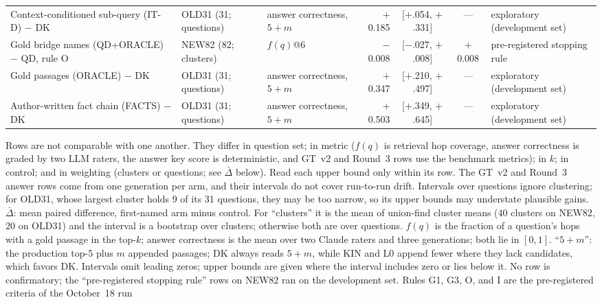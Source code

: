 \begin{table}[p]
\begin{threeparttable}
\begin{tabular}{@{}>{\raggedright\arraybackslash}p{4.7cm}>{\raggedright\arraybackslash}p{2.6cm}>{\raggedright\arraybackslash}p{2.5cm}rcc>{\raggedright\arraybackslash}p{2.2cm}@{}}
Context-conditioned sub-query (IT-D) $-$ DK & OLD31 (31; questions) & answer correctness, $5{+}m$ & $+$0.185 & {\scriptsize [$+$.054, $+$.331]} & ---\tnote{d} & exploratory (development set) \\
Gold bridge names (QD+ORACLE) $-$ QD, rule O & NEW82 (82; clusters) & $f(q)$@6 & $-$0.008 & {\scriptsize [$-$.027, $+$.008]} & $+$0.008 & pre-registered stopping rule \\
Gold passages (ORACLE) $-$ DK & OLD31 (31; questions) & answer correctness, $5{+}m$ & $+$0.347 & {\scriptsize [$+$.210, $+$.497]} & --- & exploratory (development set) \\
Author-written fact chain (FACTS) $-$ DK & OLD31 (31; questions) & answer correctness, $5{+}m$ & $+$0.503 & {\scriptsize [$+$.349, $+$.645]} & --- & exploratory (development set) \\
\bottomrule
\end{tabular}
\begin{tablenotes}\footnotesize
\item Rows are not comparable with one another. They differ in question
set; in metric ($f(q)$ is retrieval hop coverage, answer correctness is
graded by two LLM raters, the answer key score is deterministic, and
GT~v2 and Round~3 rows use the benchmark metrics); in $k$; in control;
and in weighting (clusters or questions; see $\bar{\Delta}$ below). Read each upper bound only within its
row. The GT~v2 and Round~3 answer rows come from one generation per arm,
and their intervals do not cover run-to-run drift. Intervals over
questions ignore clustering; for OLD31, whose largest cluster holds 9 of
its 31 questions, they may be too narrow, so its upper bounds may
understate plausible gains. $\bar{\Delta}$: mean paired difference, first-named arm minus
control. For ``clusters'' it is the mean of union-find cluster means (40
clusters on NEW82, 20 on OLD31) and the interval is a bootstrap over
clusters; otherwise both are over questions. $f(q)$ is the fraction of a
question's hops with a gold passage in the top-$k$; answer correctness
is the mean over two Claude raters and three generations; both lie in
$[0,1]$. ``$5{+}m$'': the production top-5 plus $m$ appended passages;
DK always reads $5{+}m$, while KIN and L0 append fewer where they lack
candidates, which favors DK. Intervals omit leading zeros; upper
bounds are given where the interval includes zero or lies below it. No
row is confirmatory; the ``pre-registered stopping rule'' rows on NEW82
ran on the development set. Rules G1, G3, O, and I are the
pre-registered criteria of the October~18 run

\end{tablenotes}
\end{threeparttable}
\end{table}

